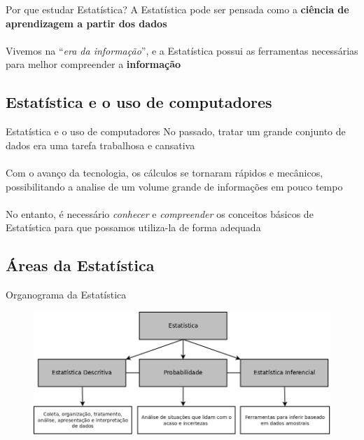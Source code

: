 \documentclass[10pt]{beamer}
\theoremstyle{definition}
\begin{document}
\begin{frame}{Por que estudar Estatística?}
  A Estatística pode ser pensada como a \textbf{ciência de aprendizagem
    a partir dos dados} \\~\\
  Vivemos na ``\textit{era da informação}'', e a Estatística possui as
  ferramentas necessárias para melhor compreender a \textbf{informação}
\end{frame}

\subsection[Computadores]{Estatística e o uso de computadores}

\begin{frame}{Estatística e o uso de computadores}
  No passado, tratar um grande conjunto de dados era uma tarefa
  trabalhosa e cansativa \\~\\

  Com o avanço da tecnologia, os cálculos se tornaram rápidos e
  mecânicos, possibilitando a analise de um volume grande de informações
  em pouco tempo \\~\\

  No entanto, é necessário \textit{conhecer} e \textit{compreender} os
  conceitos básicos de Estatística para que possamos utiliza-la de forma
  adequada
\end{frame}

\subsection[Áreas]{Áreas da Estatística}

\begin{frame}{Organograma da Estatística}
  \begin{figure}[h]
    \centering
    \includegraphics[width=1\textwidth]{../img/organograma_estatistica.png}
  \end{figure}
\end{frame}
\end{document}
